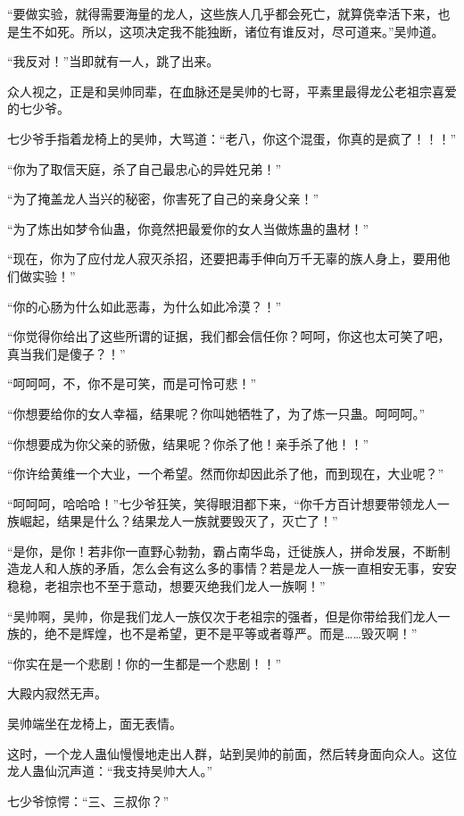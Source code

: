 \begin{this_body}
“要做实验，就得需要海量的龙人，这些族人几乎都会死亡，就算侥幸活下来，也是生不如死。所以，这项决定我不能独断，诸位有谁反对，尽可道来。”吴帅道。

“我反对！”当即就有一人，跳了出来。

众人视之，正是和吴帅同辈，在血脉还是吴帅的七哥，平素里最得龙公老祖宗喜爱的七少爷。

七少爷手指着龙椅上的吴帅，大骂道：“老八，你这个混蛋，你真的是疯了！！！”

“你为了取信天庭，杀了自己最忠心的异姓兄弟！”

“为了掩盖龙人当兴的秘密，你害死了自己的亲身父亲！”

“为了炼出如梦令仙蛊，你竟然把最爱你的女人当做炼蛊的蛊材！”

“现在，你为了应付龙人寂灭杀招，还要把毒手伸向万千无辜的族人身上，要用他们做实验！”

“你的心肠为什么如此恶毒，为什么如此冷漠？！”

“你觉得你给出了这些所谓的证据，我们都会信任你？呵呵，你这也太可笑了吧，真当我们是傻子？！”

“呵呵呵，不，你不是可笑，而是可怜可悲！”

“你想要给你的女人幸福，结果呢？你叫她牺牲了，为了炼一只蛊。呵呵呵。”

“你想要成为你父亲的骄傲，结果呢？你杀了他！亲手杀了他！！”

“你许给黄维一个大业，一个希望。然而你却因此杀了他，而到现在，大业呢？”

“呵呵呵，哈哈哈！”七少爷狂笑，笑得眼泪都下来，“你千方百计想要带领龙人一族崛起，结果是什么？结果龙人一族就要毁灭了，灭亡了！”

“是你，是你！若非你一直野心勃勃，霸占南华岛，迁徙族人，拼命发展，不断制造龙人和人族的矛盾，怎么会有这么多的事情？若是龙人一族一直相安无事，安安稳稳，老祖宗也不至于意动，想要灭绝我们龙人一族啊！”

“吴帅啊，吴帅，你是我们龙人一族仅次于老祖宗的强者，但是你带给我们龙人一族的，绝不是辉煌，也不是希望，更不是平等或者尊严。而是……毁灭啊！”

“你实在是一个悲剧！你的一生都是一个悲剧！！”

大殿内寂然无声。

吴帅端坐在龙椅上，面无表情。

这时，一个龙人蛊仙慢慢地走出人群，站到吴帅的前面，然后转身面向众人。这位龙人蛊仙沉声道：“我支持吴帅大人。”

七少爷惊愕：“三、三叔你？”


\end{this_body}
